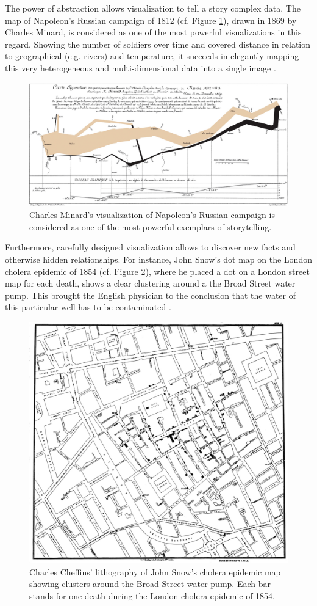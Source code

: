 The power of abstraction allows visualization to tell a story  complex data.
The map of Napoleon's Russian campaign of 1812 (cf. Figure \ref{fig:napoleons-march}), drawn in 1869 by Charles Minard, is considered as one of the most powerful visualizations in this regard.
Showing the number of soldiers over time and covered distance in relation to geographical  (e.g. rivers) and temperature, it succeeds in elegantly mapping this very heterogeneous and multi-dimensional data into a single image \cite{Tufte:1983:VisualDisplay,Chen:2010:InformationVisualization}.
%
\begin{figure}[ht]
	\centering
	\includegraphics[width=0.75\linewidth]{figures/napoleons-march.jpg}
	\caption{Charles Minard's visualization of Napoleon's Russian campaign is considered as one of the most powerful exemplars of storytelling.}
	\label{fig:napoleons-march}
\end{figure}

Furthermore, carefully designed visualization allows to discover new facts and otherwise hidden relationships.
For instance, John Snow's dot map on the London cholera epidemic of 1854 (cf. Figure \ref{fig:cholera-map}), where he placed a dot on a London street map for each death, shows a clear clustering around a the Broad Street water pump.
This brought the English physician to the conclusion that the water of this particular well has to be contaminated \cite{Tufte:1997:VisualExplanations,Chen:2010:InformationVisualization}.
%
\begin{figure}[ht]
	\centering
	\includegraphics[width=0.75\linewidth]{figures/cholera-map.jpg}
	\caption{Charles Cheffins' lithography of John Snow's cholera epidemic map showing clusters around the Broad Street water pump. Each bar stands for one death during the London cholera epidemic of 1854.}
	\label{fig:cholera-map}
\end{figure}



